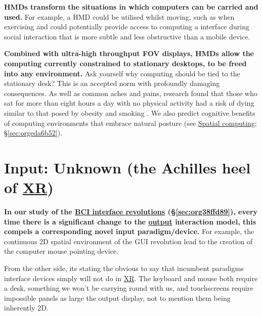 \documentclass[logo,bsc,singlespacing,parskip]{infthesis}
\begin{document}
\textbf{HMDs transform the situations in which computers can be carried and used.}
For example, a HMD could be utilised whilst moving, such as when exercising and could potentially provide access to computing a interface during social interaction that is more subtle and less obstructive than a mobile device.

\textbf{Combined with ultra-high throughput FOV displays, HMDs allow the computing currently constrained to stationary desktops, to be freed into any environment.}
Ask yourself why computing should be tied to the stationary desk?
This is an accepted norm with profoundly damaging consequences.
As well as common aches and pains, research found that those who sat for more than eight hours a day with no physical activity had a risk of dying similar to that posed by obesity and smoking \autocite{laskowskiSittingRisksHow}.
We also predict cognitive benefits of computing environments that embrace natural posture (see \hyperref[sec:orgeda6b52]{Spatial computing}; \S \ref{sec:orgeda6b52}).

\section{Input: Unknown (the Achilles heel of \hyperref[org53dbe83]{XR})}
\label{sec:org5bf0840}
\textbf{In our study of the \hyperref[sec:org38ffd89]{BCI interface revolutions} (\S \ref{sec:org38ffd89}), every time there is a significant change to the \hyperref[output]{output} interaction model, this compels a corresponding novel input paradigm/device.}
For example, the continuous 2D spatial environment of the GUI revolution lead to the creation of the computer mouse pointing device.

From the other side, its stating the obvious to say that incumbent paradigms interface devices simply will not do in \hyperref[org53dbe83]{XR}.
The keyboard and mouse both require a desk, something we won't be carrying round with us, and touchscreens require impossible panels as large the output display, not to mention them being inherently 2D.
\end{document}
